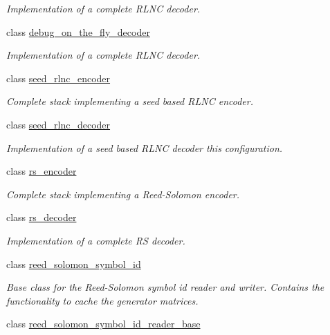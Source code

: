 \begin{DoxyCompactItemize}
\begin{DoxyCompactList}\small\item\em Implementation of a complete R\-L\-N\-C decoder. \end{DoxyCompactList}\item 
class \hyperlink{classkodo_1_1debug__on__the__fly__decoder}{debug\-\_\-on\-\_\-the\-\_\-fly\-\_\-decoder}
\begin{DoxyCompactList}\small\item\em Implementation of a complete R\-L\-N\-C decoder. \end{DoxyCompactList}\item 
class \hyperlink{classkodo_1_1seed__rlnc__encoder}{seed\-\_\-rlnc\-\_\-encoder}
\begin{DoxyCompactList}\small\item\em Complete stack implementing a seed based R\-L\-N\-C encoder. \end{DoxyCompactList}\item 
class \hyperlink{classkodo_1_1seed__rlnc__decoder}{seed\-\_\-rlnc\-\_\-decoder}
\begin{DoxyCompactList}\small\item\em Implementation of a seed based R\-L\-N\-C decoder this configuration. \end{DoxyCompactList}\item 
class \hyperlink{classkodo_1_1rs__encoder}{rs\-\_\-encoder}
\begin{DoxyCompactList}\small\item\em Complete stack implementing a Reed-\/\-Solomon encoder. \end{DoxyCompactList}\item 
class \hyperlink{classkodo_1_1rs__decoder}{rs\-\_\-decoder}
\begin{DoxyCompactList}\small\item\em Implementation of a complete R\-S decoder. \end{DoxyCompactList}\item 
class \hyperlink{classkodo_1_1reed__solomon__symbol__id}{reed\-\_\-solomon\-\_\-symbol\-\_\-id}
\begin{DoxyCompactList}\small\item\em Base class for the Reed-\/\-Solomon symbol id reader and writer. Contains the functionality to cache the generator matrices. \end{DoxyCompactList}\item 
class \hyperlink{classkodo_1_1reed__solomon__symbol__id__reader__base}{reed\-\_\-solomon\-\_\-symbol\-\_\-id\-\_\-reader\-\_\-base}

\end{DoxyCompactItemize}
